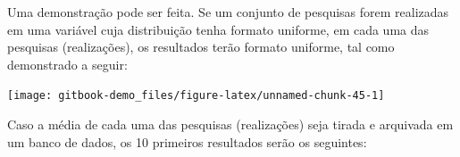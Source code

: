 \documentclass[
]{book}
\newenvironment{Shaded}{\begin{snugshade}}{\end{snugshade}}
\newcommand{\KeywordTok}[1]{\textcolor[rgb]{0.13,0.29,0.53}{\textbf{#1}}}
\newcommand{\NormalTok}[1]{#1}
\newcommand{\OperatorTok}[1]{\textcolor[rgb]{0.81,0.36,0.00}{\textbf{#1}}}
\newcommand{\StringTok}[1]{\textcolor[rgb]{0.31,0.60,0.02}{#1}}
\begin{document}
Uma demonstração pode ser feita. Se um conjunto de pesquisas forem realizadas em uma variável cuja distribuição tenha formato uniforme, em cada uma das pesquisas (realizações), os resultados terão formato uniforme, tal como demonstrado a seguir:

\begin{center}\texttt{[image: gitbook-demo\_files/figure-latex/unnamed-chunk-45-1]} \end{center}

Caso a média de cada uma das pesquisas (realizações) seja tirada e arquivada em um banco de dados, os 10 primeiros resultados serão os seguintes:

\begin{Shaded}
\end{Shaded}
\end{document}
